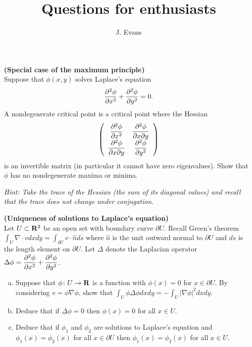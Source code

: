 \documentclass[12pt]{article}
\title{Questions for enthusiasts}
\author{J. Evans}
\date{}
\begin{document}
\maketitle



\begin{question}{\bf (Special case of the maximum principle)}\\
Suppose that $\phi(x,y)$ solves Laplace's equation
\[\dfrac{\partial^2 \phi}{\partial x^2}+\dfrac{\partial^2 \phi}{\partial y^2}=0.\]
A nondegenerate critical point is a critical point where the Hessian
\[
\left(\begin{array}{cc}
\dfrac{\partial^2 \phi}{\partial x^2} & \dfrac{\partial^2 \phi}{\partial x\partial y}\\
\dfrac{\partial^2 \phi}{\partial x\partial y} & \dfrac{\partial^2 \phi}{\partial y^2}
\end{array}\right)
\]
is an invertible matrix (in particular it cannot have zero eigenvalues). Show that $\phi$ has no nondegenerate maxima or minima.

{\em Hint: Take the trace of the Hessian (the sum of its diagonal values) and recall that the trace does not change under conjugation.}
\end{question}

\iffalse
\begin{answer}
If $(x,y)$ is a nondegenerate critical point then the eigenvalues of the Hessian are nonzero. If $(x,y)$ is a maximum or minimum then the eigenvalues $\lambda_1,\lambda_2$ of the Hessian matrix have the same sign. The trace of a matrix is the sum of its diagonal values and equals the trace of its diagonalisation, therefore
\[\ppd{\phi}{x}+\ppd{\phi}{y}=\lambda_1+\lambda_2.\]
But the sum of the eigenvalues is either positive (if both are positive) or negative (if both are negative) and hence never zero.
\end{answer}
\fi

\bigskip

\begin{question}{\bf (Uniqueness of solutions to Laplace's equation)}\\
Let $U\subset\mathbf{R}^2$ be an open set with boundary curve $\partial U$. Recall Green's theorem $\int_U\nabla\cdot v dxdy=\int_{\partial U}v\cdot\hat{n}ds$ where $\hat{n}$ is the unit outward normal to $\partial U$ and $ds$ is the length element on $\partial U$. Let $\Delta$ denote the Laplacian operator $\Delta\phi=\dfrac{\partial^2 \phi}{\partial x^2}+\dfrac{\partial^2 \phi}{\partial y^2}$.
\begin{enumerate}[(a)]
\item Suppose that $\phi\colon U\to\mathbf{R}$ is a function with $\phi(x)=0$ for $x\in\partial U$. By considering $v=\phi\nabla\phi$, show that $\int_U\phi\Delta\phi dxdy=-\int_U|\nabla\phi|^2dxdy$.
\item Deduce that if $\Delta\phi=0$ then $\phi(x)=0$ for all $x\in U$.
\item Deduce that if $\phi_1$ and $\phi_2$ are solutions to Laplace's equation and $\phi_1(x)=\phi_2(x)$ for all $x\in\partial U$ then $\phi_1(x)=\phi_2(x)$ for all $x\in U$.
\end{enumerate}
\end{question}
\end{document}
